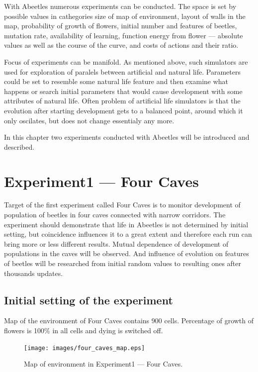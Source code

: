 \documentclass[a4paper,12pt]{report}
\begin{document}
With Abeetles numerous experiments can be conducted. The space is set by possible values in cathegories size of map of environment, layout of walls in the map, probability of growth of flowers, initial	number and features of beetles,	mutation rate, availability of learning, function energy from flower --- absolute values	as well as the course of the curve, and costs of actions and their ratio.

Focus of experiments can be manifold. As mentioned above, such simulators are used for exploration of paralels between artificial and natural life. Parameters could be set to resemble some natural life feature and then examine what happens or search initial parameters that would cause development with some attributes of natural life. Often problem of artificial life simulators is that the evolution after starting development gets to a balanced point, around which it only oscilates, but does not change essentialy any more. %

In this chapter two experiments conducted with Abeetles will be introduced and described.

\section{Experiment1 --- Four Caves}

Target of the first experiment called Four Caves is to monitor development of population of beetles in four caves connected with narrow corridors. The experiment should demonstrate that life in Abeetles is not determined by initial setting, but coincidence influences it to a great extent and therefore each run can bring more or less different results. Mutual dependence of development of populations in the caves will be observed. And influence of evolution on features of beetles will be researched from initial random values to resulting ones after thousands updates. 

\subsection{Initial setting of the experiment}
Map of the environment of Four Caves contains 900 cells. Percentage of growth of flowers is 100\% in all cells and dying is switched off. 

\begin{figure}
\begin{center}
  \texttt{[image: images/four\_caves\_map.eps]}
  \caption{Map of environment in Experiment1 --- Four Caves.}
  \label{img.four_caves_map}
\end{center}
\end{figure}
\end{document}
